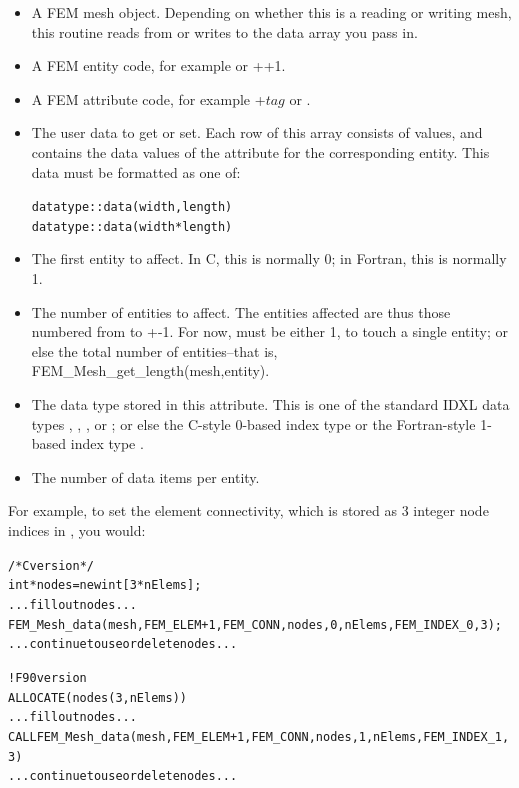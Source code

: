 \begin{itemize}
\item {} A FEM mesh object.  Depending on whether this is
   a reading or writing mesh, this routine reads from or writes to
   the data array you pass in.

\item {} A FEM entity code, for example  or
   ++1.

\item {} A FEM attribute code, for example +$tag$
   or .  
 
\item {} The user data to get or set.  Each row of this array consists
  of  values, and contains the data values of the attribute for the
  corresponding entity.  This data must be formatted as one of:
  \begin{alltt}
      datatype :: data(width,length)
      datatype :: data(width*length)
  \end{alltt}

\item {} The first entity to affect.  In C, this is normally 0;
  in Fortran, this is normally 1.

\item {} The number of entities to affect.  The entities
  affected are thus those numbered from  to +-1.
  For now,  must be either 1, to touch a single entity; or
  else the total number of entities--that is, FEM\_Mesh\_get\_length(mesh,entity).

\item {} The data type stored in this attribute.  This
  is one of the standard IDXL data types , , 
  , or ; or else the C-style 0-based
  index type  or the Fortran-style 1-based index type
  .

\item {} The number of data items per entity. 

\end{itemize}

For example, to set the element connectivity, which is stored as 
3 integer node indices in , you would:

  \begin{alltt}
/* C version */
   int *nodes=new int[3*nElems];
   ... fill out nodes ...
   FEM\_Mesh\_data(mesh,FEM\_ELEM+1,FEM\_CONN, nodes, 0,nElems, FEM\_INDEX\_0, 3);
   ... continue to use or delete nodes ...
   
! F90 version
   ALLOCATE(nodes(3,nElems))
   ... fill out nodes ...
   CALL FEM\_Mesh\_data(mesh,FEM\_ELEM+1,FEM\_CONN, nodes, 1,nElems, FEM\_INDEX\_1, 3)
   ... continue to use or delete nodes ...
  \end{alltt}


